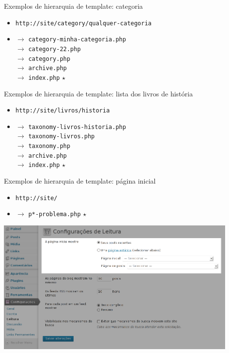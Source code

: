 \documentclass[handout]{beamer}
\begin{document}
\begin{frame}{Exemplos de hierarquia de template: categoria}
\begin{itemize}
  \pause \item \texttt{http://site/category/qualquer-categoria}
  \pause \item $\rightarrow$ \texttt{category-minha-categoria.php} \\
    \pause $\rightarrow$ \texttt{category-22.php} \\
    \pause $\rightarrow$ \texttt{category.php} \\
    \pause $\rightarrow$ \texttt{archive.php} \\
    \pause $\rightarrow$ \texttt{index.php} $\star$
\end{itemize}
\end{frame}

\begin{frame}{Exemplos de hierarquia de template: lista dos livros de história}
\begin{itemize}
  \pause \item \texttt{http://site/livros/historia}
  \pause \item $\rightarrow$ \texttt{taxonomy-livros-historia.php} \\
    \pause $\rightarrow$ \texttt{taxonomy-livros.php} \\
    \pause $\rightarrow$ \texttt{taxonomy.php} \\
    \pause $\rightarrow$ \texttt{archive.php} \\
    \pause $\rightarrow$ \texttt{index.php} $\star$
\end{itemize}
\end{frame}

\begin{frame}{Exemplos de hierarquia de template: página inicial}
\begin{itemize}
  \pause \item \texttt{http://site/}
  \pause \item $\rightarrow$ \texttt{p*-problema.php} $\star$
\end{itemize}
\end{frame}

\begin{frame}
\begin{center}
  \includegraphics[width=0.9\textwidth]{./img/option-show-on-front.png}
\end{center}
\end{frame}
\end{document}
